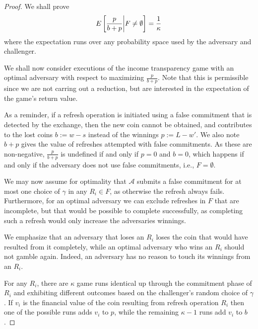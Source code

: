 \begin{proof}
  We shall prove
  \begin{equation}\label{eq:income-transparency-proof}
    E\left[{\frac{p}{b + p}} \middle| F \neq \emptyset\right] = {\frac{1}{\kappa}}
  \end{equation}
  where the expectation runs over
  any probability space used by the adversary and challenger.

  We shall now consider executions of the income transparency game with an
  optimal adversary with respect to maximizing $\frac{p}{b + p}$.  Note that this
  is permissible since we are not carring out a reduction, but are interested
  in the expectation of the game's return value.

  As a reminder, if a refresh operation is initiated using a false commitment
  that is detected by the exchange, then the new coin cannot be obtained, and
  contributes to the lost coins $b := w - s$ instead of the winnings $p := L -
  w'$.  We also note $b + p$ gives the value of
  refreshes attempted with false commitments.  As these are non-negative, 
  $\frac{p}{b + p}$ is undefined if and only if $p = 0$ and $b = 0$, which happens if and
  only if the adversary does not use false commitments, i.e., $F = \emptyset$.

  We may now assume for optimality that $\mathcal{A}$ submits a false
  commitment for at most one choice of $\gamma$ in any $R_i \in F$, as
  otherwise the refresh always fails.  Furthermore, for an optimal adversary we
  can exclude refreshes in $F$ that are incomplete, but that would be possible
  to complete successfully, as completing such a refresh would only increase the
  adversaries winnings.

  We emphasize that an adversary that loses an $R_i$ loses the coin that would
  have resulted from it completely, while an optimal adversary who wins an
  $R_i$ should not gamble again.  Indeed, an adversary has no reason to touch
  its winnings from an $R_i$.


  For any $R_i$, there are $\kappa$ game runs identical up through the
  commitment phase of $R_i$ and exhibiting different outcomes based on the
  challenger's random choice of $\gamma$.
  If $v_i$ is the financial value of the coin resulting from refresh operation
  $R_i$ then one of the possible runs adds $v_i$ to $p$, while the remaining
  $\kappa-1$ runs add $v_i$ to $b$.


\end{proof}
